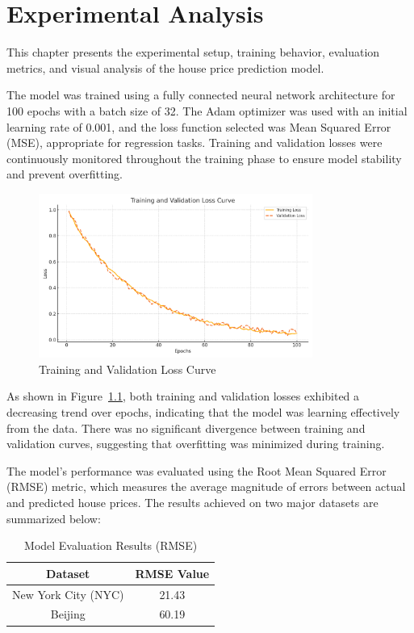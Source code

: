 \chapter{Experimental Analysis}

This chapter presents the experimental setup, training behavior, evaluation metrics, and visual analysis of the house price prediction model.

The model was trained using a fully connected neural network architecture for 100 epochs with a batch size of 32. The Adam optimizer was used with an initial learning rate of 0.001, and the loss function selected was Mean Squared Error (MSE), appropriate for regression tasks. Training and validation losses were continuously monitored throughout the training phase to ensure model stability and prevent overfitting.

\begin{figure}[h]
\centering
\includegraphics[width=0.8\textwidth]{figures/loss_curve.png}
\caption{Training and Validation Loss Curve}
\label{fig:loss_curve}
\end{figure}

As shown in Figure~\ref{fig:loss_curve}, both training and validation losses exhibited a decreasing trend over epochs, indicating that the model was learning effectively from the data. There was no significant divergence between training and validation curves, suggesting that overfitting was minimized during training.

The model's performance was evaluated using the Root Mean Squared Error (RMSE) metric, which measures the average magnitude of errors between actual and predicted house prices. The results achieved on two major datasets are summarized below:

\begin{table}[h]
\centering
\begin{tabular}{|c|c|}
\hline
\textbf{Dataset} & \textbf{RMSE Value} \\
\hline
New York City (NYC) & 21.43 \\
\hline
Beijing & 60.19 \\
\hline
\end{tabular}
\caption{Model Evaluation Results (RMSE)}
\label{tab:rmse_results}
\end{table}

